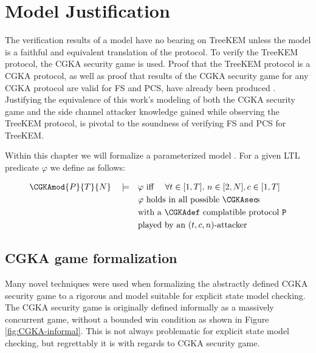 \hypertarget{sec:justification}{%
\chapter{Model Justification}\label{sec:justification}}

The verification results of a model have no bearing on TreeKEM unless the model is a faithful and equivalent translation of the protocol.
To verify the TreeKEM protocol, the CGKA security game is used.
Proof that the TreeKEM protocol is a CGKA protocol, as well as proof that results of the CGKA security game for any CGKA protocol are valid for FS and PCS, have already been produced \autocite{alwen2020security}.
Justifying the equivalence of this work's modeling of both the CGKA security game and the side channel attacker knowledge gained while observing the TreeKEM protocol, is pivotal to the soundness of verifying FS and PCS for TreeKEM.

Within this chapter we will formalize a parameterized model .
For a given LTL predicate $\varphi$ we define  as follows:

\[
\begin{split}
\CGKAmod{P}{T}{N}\quad\models\quad& \varphi \textrm{ iff }\quad\forall t \in [1, T],\, n \in [2, N], c \in [1, T]\\
  & \varphi \textrm{ holds in all possible \CGKAsec\!s}\\
  & \textrm{with a \CGKAdef complatible protocol } \mathtt{P}\\
  & \textrm{played by an } (t, c, n)\textrm{-attacker}
\end{split}
\]


\hypertarget{sec:game-adaptations}{%
\section{CGKA game formalization}\label{sec:game-adaptations}}

Many novel techniques were used when formalizing the abstractly defined CGKA security game to a rigorous and model suitable for explicit state model checking.
The CGKA security game is originally defined informally as a massively concurrent game, without a bounded win condition as shown in Figure \ref{fig:CGKA-informal}.
This is not always problematic for explicit state model checking, but regrettably it is with regards to CGKA security game.

